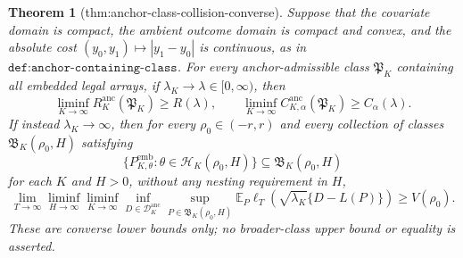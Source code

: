\documentclass{article}
\newtheorem{theorem}{Theorem}
\begin{document}
\begin{theorem}[thm:anchor-class-collision-converse]\label{thm:anchor-class-collision-converse}
Suppose that the covariate domain is compact, the ambient outcome
domain is compact and convex, and the absolute cost
\((y_0,y_1)\mapsto|y_1-y_0|\) is continuous, as in
\(\texttt{def:anchor-containing-class}\).  For every anchor-admissible
class \(\mathfrak P_K\) containing all embedded legal arrays, if
\(\lambda_K\to\lambda\in[0,\infty)\), then
\[
 \liminf_{K\to\infty}
 R_K^{\mathrm{anc}}(\mathfrak P_K)\ge R(\lambda),
 \qquad
 \liminf_{K\to\infty}
 C_{K,\alpha}^{\mathrm{anc}}(\mathfrak P_K)
 \ge C_\alpha(\lambda).
\]
If instead \(\lambda_K\to\infty\), then for every
\(\rho_0\in(-r,r)\) and every collection of classes
\(\mathfrak B_K(\rho_0,H)\) satisfying
\[
 \{P_{K,\theta}^{\mathrm{emb}}:
 \theta\in\mathcal H_K(\rho_0,H)\}
 \subseteq\mathfrak B_K(\rho_0,H)
\]
for each \(K\) and \(H>0\), without any nesting requirement in \(H\),
\[
 \lim_{T\to\infty}\liminf_{H\to\infty}\liminf_{K\to\infty}
 \inf_{D\in\mathscr D_K^{\mathrm{anc}}}
 \sup_{P\in\mathfrak B_K(\rho_0,H)}
 \mathbb E_P\ell_T\!\left(
 \sqrt{\lambda_K}\{D-L(P)\}\right)
 \ge V(\rho_0).
\]
These are converse lower bounds only; no broader-class upper bound or
equality is asserted.
\end{theorem}
\end{document}
